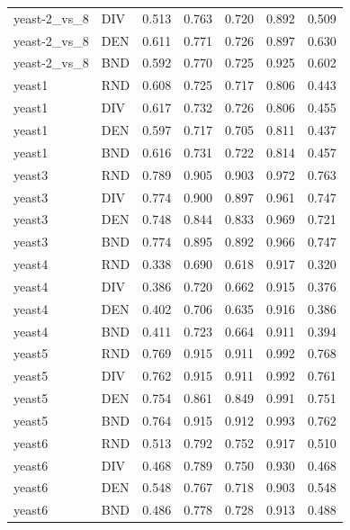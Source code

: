 \documentclass[10pt,a4paper]{article}
\begin{document}
\begin{longtable}{lllllrr}
yeast-2\_vs\_8 & DIV & 0.513 & 0.763 & 0.720 & 0.892 & 0.509 \\
yeast-2\_vs\_8 & DEN & 0.611 & 0.771 & 0.726 & 0.897 & 0.630 \\
yeast-2\_vs\_8 & BND & 0.592 & 0.770 & 0.725 & 0.925 & 0.602 \\
yeast1 & RND & 0.608 & 0.725 & 0.717 & 0.806 & 0.443 \\
yeast1 & DIV & 0.617 & 0.732 & 0.726 & 0.806 & 0.455 \\
yeast1 & DEN & 0.597 & 0.717 & 0.705 & 0.811 & 0.437 \\
yeast1 & BND & 0.616 & 0.731 & 0.722 & 0.814 & 0.457 \\
yeast3 & RND & 0.789 & 0.905 & 0.903 & 0.972 & 0.763 \\
yeast3 & DIV & 0.774 & 0.900 & 0.897 & 0.961 & 0.747 \\
yeast3 & DEN & 0.748 & 0.844 & 0.833 & 0.969 & 0.721 \\
yeast3 & BND & 0.774 & 0.895 & 0.892 & 0.966 & 0.747 \\
yeast4 & RND & 0.338 & 0.690 & 0.618 & 0.917 & 0.320 \\
yeast4 & DIV & 0.386 & 0.720 & 0.662 & 0.915 & 0.376 \\
yeast4 & DEN & 0.402 & 0.706 & 0.635 & 0.916 & 0.386 \\
yeast4 & BND & 0.411 & 0.723 & 0.664 & 0.911 & 0.394 \\
yeast5 & RND & 0.769 & 0.915 & 0.911 & 0.992 & 0.768 \\
yeast5 & DIV & 0.762 & 0.915 & 0.911 & 0.992 & 0.761 \\
yeast5 & DEN & 0.754 & 0.861 & 0.849 & 0.991 & 0.751 \\
yeast5 & BND & 0.764 & 0.915 & 0.912 & 0.993 & 0.762 \\
yeast6 & RND & 0.513 & 0.792 & 0.752 & 0.917 & 0.510 \\
yeast6 & DIV & 0.468 & 0.789 & 0.750 & 0.930 & 0.468 \\
yeast6 & DEN & 0.548 & 0.767 & 0.718 & 0.903 & 0.548 \\
yeast6 & BND & 0.486 & 0.778 & 0.728 & 0.913 & 0.488 \\
\end{longtable}
\endgroup
\clearpage
\end{document}
